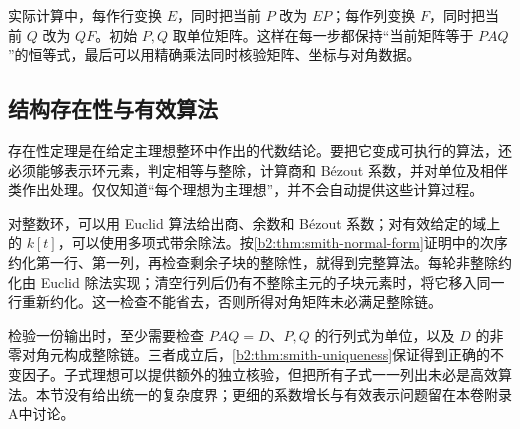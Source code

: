 \ProseParagraphBreak
实际计算中，每作行变换 \(E\)，同时把当前 \(P\) 改为 \(EP\)；每作列变换 \(F\)，同时把当前 \(Q\) 改为 \(QF\)。初始 \(P,Q\) 取单位矩阵。这样在每一步都保持“当前矩阵等于 \(PAQ\)”的恒等式，最后可以用精确乘法同时核验矩阵、坐标与对角数据。

\subsection{结构存在性与有效算法}
\label{b2:subsec:0402:04}

存在性定理是在给定主理想整环中作出的代数结论。要把它变成可执行的算法，还必须能够表示环元素，判定相等与整除，计算商和 Bézout 系数，并对单位及相伴类作出处理。仅仅知道“每个理想为主理想”，并不会自动提供这些计算过程。

\ProseParagraphBreak
对整数环，可以用 Euclid 算法给出商、余数和 Bézout 系数；对有效给定的域上的 \(k[t]\)，可以使用多项式带余除法。按\cref{b2:thm:smith-normal-form}证明中的次序约化第一行、第一列，再检查剩余子块的整除性，就得到完整算法。每轮非整除约化由 Euclid 除法实现；清空行列后仍有不整除主元的子块元素时，将它移入同一行重新约化。这一检查不能省去，否则所得对角矩阵未必满足整除链。

\ProseParagraphBreak
检验一份输出时，至少需要检查 \(PAQ=D\)、\(P,Q\) 的行列式为单位，以及 \(D\) 的非零对角元构成整除链。三者成立后，\cref{b2:thm:smith-uniqueness}保证得到正确的不变因子。子式理想可以提供额外的独立核验，但把所有子式一一列出未必是高效算法。本节没有给出统一的复杂度界；更细的系数增长与有效表示问题留在本卷附录A中讨论。
